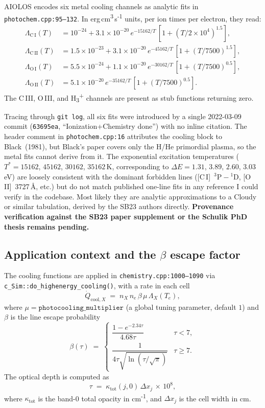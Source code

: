 \documentclass[english,a4paper]{my_memo}
\begin{document}
AIOLOS encodes six metal cooling channels as analytic fits in
\texttt{photochem.cpp:95--132}.  In erg\,cm\textsuperscript{3}\,s\textsuperscript{-1}
units, per ion times per electron, they read:
\begin{align}
\Lambda_{\mathrm{C\,I}}(T)  &= 10^{-24} + 3.1\times10^{-20}\,e^{-15162/T}\,
                                \left[1 + (T/2\times10^{4})^{1.5}\right], \\
\Lambda_{\mathrm{C\,II}}(T) &= 1.5\times10^{-23} + 3.1\times10^{-20}\,e^{-45162/T}\,
                                \left[1 + (T/7500)^{1.5}\right], \\
\Lambda_{\mathrm{O\,I}}(T)  &= 5.5\times10^{-24} + 1.1\times10^{-20}\,e^{-30162/T}\,
                                \left[1 + (T/7500)^{0.5}\right], \\
\Lambda_{\mathrm{O\,II}}(T) &= 5.1\times10^{-20}\,e^{-35162/T}\,
                                \left[1 + (T/7500)^{0.5}\right].
\end{align}
The C\,III, O\,III, and H\textsubscript{3}\textsuperscript{+}
channels are present as stub functions returning zero.

Tracing through \texttt{git log}, all six fits were introduced by a single
2022-03-09 commit (\texttt{63695ea}, ``Ionization+Chemistry done'') with
no inline citation.  The header comment in \texttt{photochem.cpp:16}
attributes the cooling block to Black~(1981), but Black's paper covers
only the H/He primordial plasma, so the metal fits cannot derive from
it.  The exponential excitation temperatures
(\(T^\ast = 15162\), \(45162\), \(30162\), \(35162\)\,K, corresponding
to \(\Delta E = 1.31\), \(3.89\), \(2.60\), \(3.03\) eV) are
loosely consistent with the dominant forbidden lines
([C\,I]~\(\mathrm{^{3}P\!-\!^{1}D}\),
[O\,II]~3727\,\AA, etc.) but do not match published one-line fits
in any reference I could verify in the codebase.  Most likely they are
analytic approximations to a Cloudy or similar tabulation, derived by
the SB23 authors directly.  \textbf{Provenance verification against the
SB23 paper supplement or the Schulik PhD thesis remains pending.}

\subsection{Application context and the $\beta$ escape factor}

The cooling functions are applied in
\texttt{chemistry.cpp:1000--1090} via
\verb|c_Sim::do_highenergy_cooling()|, with a rate in each cell
\[
  \dot{Q}_{\mathrm{cool},X} \;=\; n_X\, n_e\, \beta\, \mu\, \Lambda_X(T_e),
\]
where \(\mu = \texttt{photocooling\_multiplier}\) (a global tuning
parameter, default \(1\)) and \(\beta\) is the line escape probability
\[
  \beta(\tau) \;=\;
  \begin{cases}
    \dfrac{1 - e^{-2.34\tau}}{4.68\tau} & \tau < 7,\\[6pt]
    \dfrac{1}{4\tau\sqrt{\ln(\tau/\sqrt{\pi})}} & \tau \ge 7.
  \end{cases}
\]
The optical depth is computed as
\[
  \tau \;=\; \kappa_{\mathrm{tot}}(j,0)\,\Delta x_j\,\times\,10^{8},
\]
where \(\kappa_{\mathrm{tot}}\) is the band-0 total opacity in
cm\textsuperscript{-1}, and \(\Delta x_j\) is the cell width in cm.
\end{document}

